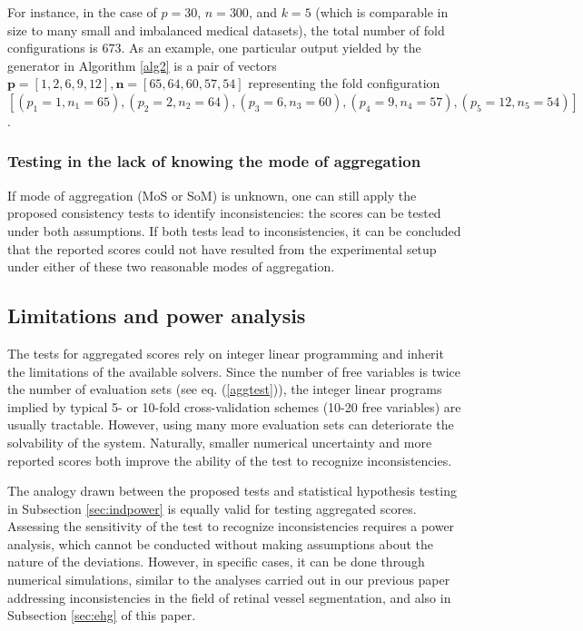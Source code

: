 \documentclass[3p, times]{elsarticle}
\begin{document}
For instance, in the case of $p=30$, $n=300$, and $k=5$ (which is comparable in size to many small and imbalanced medical datasets), the total number of fold configurations is $673$. As an example, one particular output yielded by the generator in Algorithm \ref{alg2} is a pair of vectors $\mathbf{p}=[1, 2, 6, 9, 12], \mathbf{n} = [65, 64, 60, 57, 54]$ representing the fold configuration $[(p_1=1, n_1=65), (p_2=2, n_2=64), (p_3=6, n_3=60), (p_4=9, n_4=57), (p_5=12, n_5=54)]$.

\subsubsection{Testing in the lack of knowing the mode of aggregation}
\label{sec:lackagg}

If mode of aggregation (MoS or SoM) is unknown, one can still apply the proposed consistency tests to identify inconsistencies: the scores can be tested under both assumptions. If both tests lead to inconsistencies, it can be concluded that the reported scores could not have resulted from the experimental setup under either of these two reasonable modes of aggregation.

\subsection{Limitations and power analysis}
\label{sec:aggpower}

The tests for aggregated scores rely on integer linear programming and inherit the limitations of the available solvers. Since the number of free variables is twice the number of evaluation sets (see eq. (\ref{aggtest})), the integer linear programs implied by typical 5- or 10-fold cross-validation schemes (10-20 free variables) are usually tractable. However, using many more evaluation sets can deteriorate the solvability of the system. Naturally, smaller numerical uncertainty and more reported scores both improve the ability of the test to recognize inconsistencies.

The analogy drawn between the proposed tests and statistical hypothesis testing in Subsection \ref{sec:indpower} is equally valid for testing aggregated scores. Assessing the sensitivity of the test to recognize inconsistencies requires a power analysis, which cannot be conducted without making assumptions about the nature of the deviations. However, in specific cases, it can be done through numerical simulations, similar to the analyses carried out in our previous paper \cite{vessel} addressing inconsistencies in the field of retinal vessel segmentation, and also in Subsection \ref{sec:ehg} of this paper.
\end{document}

